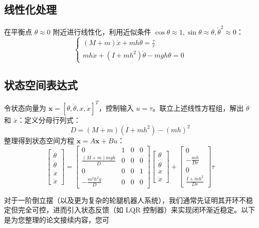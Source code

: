 \documentclass[
  oneside,
  degree=bachelor,
  fullwidthstop=false,
  fontset=fandol,
  times=false,
  minted=true,
  biblatex=true,
]{tongjithesis}
\begin{document}
\subsection{线性化处理}
在平衡点 $\theta \approx 0$ 附近进行线性化，利用近似条件 $\cos\theta \approx 1, 
\sin\theta \approx \theta, \dot{\theta}^2 \approx 0$：
\begin{equation}
\begin{cases}
(M + m)\ddot{x} + mh\ddot{\theta} = \frac{\tau}{r} \\
mh\ddot{x} + (I + mh^2)\ddot{\theta} - mgh\theta = 0
\end{cases}
\end{equation}

\subsection{状态空间表达式}
令状态向量为 $\mathbf{x} = [\theta, \dot{\theta}, x, \dot{x}]^T$，控制输入 $u = \tau$。联立上述线性方程组，解出 $\ddot{\theta}$ 和 $\ddot{x}$：定义分母行列式：$$D = (M+m)(I+mh^2) - (mh)^2$$整理得到状态空间方程 $\dot{\mathbf{x}} = A\mathbf{x} + Bu$：
\begin{equation}
\begin{bmatrix}
\dot{\theta} \\
\ddot{\theta} \\
\dot{x} \\
\ddot{x}
\end{bmatrix}
=
\begin{bmatrix}
0 & 1 & 0 & 0 \\
\frac{(M+m)mgh}{D} & 0 & 0 & 0 \\
0 & 0 & 0 & 1 \\
-\frac{m^2h^2g}{D} & 0 & 0 & 0
\end{bmatrix}
\begin{bmatrix}
\theta \\
\dot{\theta} \\
x \\
\dot{x}
\end{bmatrix}
+
\begin{bmatrix}
0 \\
-\frac{mh}{Dr} \\
0 \\
\frac{I+mh^2}{Dr}
\end{bmatrix}
\tau
\end{equation}

对于一阶倒立摆（以及更为复杂的轮腿机器人系统），我们通常先证明其开环不稳定但完全可控，进而引入状态反馈（如 LQR 控制器）来实现闭环渐近稳定。以下是为您整理的论文接续内容，您可
\end{document}

